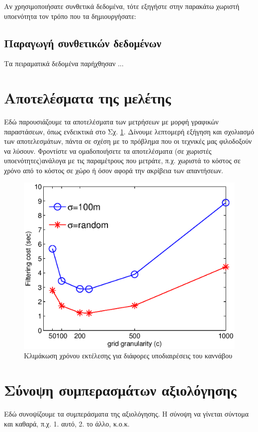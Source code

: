 Αν χρησιμοποιήσατε συνθετικά δεδομένα, τότε εξηγήστε στην παρακάτω χωριστή υποενότητα τον τρόπο που τα δημιουργήσατε:

\subsection{Παραγωγή συνθετικών δεδομένων}

Τα πειραματικά δεδομένα παρήχθησαν ...


\section{Αποτελέσματα της μελέτης}

Εδώ παρουσιάζουμε τα αποτελέσματα των μετρήσεων με μορφή γραφικών παραστάσεων, όπως ενδεικτικά στο Σχ. \ref{GridGranularity}. Δίνουμε λεπτομερή εξήγηση και σχολιασμό των αποτελεσμάτων, πάντα σε σχέση με το πρόβλημα που οι τεχνικές μας φιλοδοξούν να λύσουν. 
Φροντίστε να ομαδοποιήσετε τα αποτελέσματα (σε χωριστές υποενότητες)ανάλογα με τις παραμέτρους που μετράτε, π.χ. χωριστά το κόστος σε χρόνο από το κόστος σε χώρο ή όσον αφορά την ακρίβεια των απαντήσεων.

\begin{figure}[t!]
\includegraphics[scale=0.5]{figures/grid_granularity.eps}
\centering
\caption{Κλιμάκωση χρόνου εκτέλεσης για διάφορες υποδιαιρέσεις του καννάβου}	
\label{GridGranularity}
\end{figure} 


\section{Σύνοψη συμπερασμάτων αξιολόγησης}

Εδώ συνοψίζουμε τα συμπεράσματα της αξιολόγησης. Η σύνοψη να γίνεται σύντομα και καθαρά, π.χ. 1. αυτό, 2. το άλλο, κ.ο.κ.

